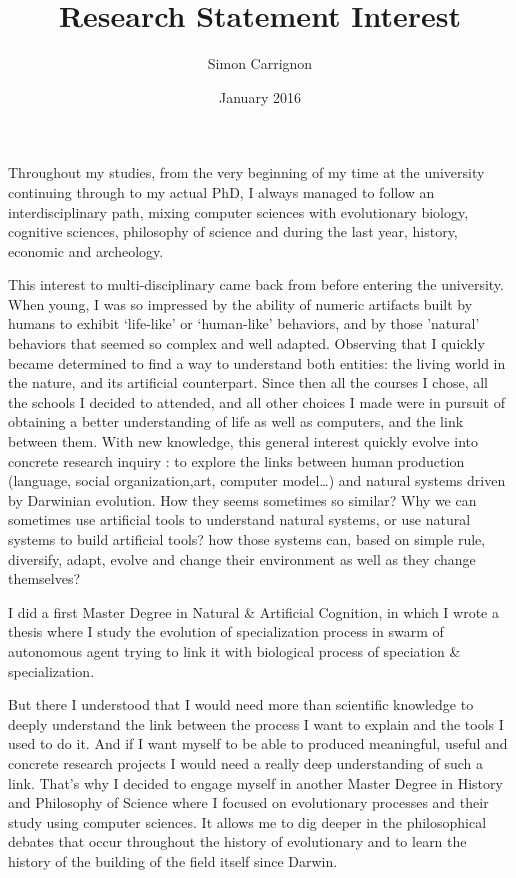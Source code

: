\documentclass[10pt]{paper}
\author{Simon Carrignon}
\title{Research Statement Interest}
\date{January 2016}
\begin{document}
\maketitle


Throughout my studies, from the very beginning of my time at the university continuing through to my actual PhD, I always managed to follow an interdisciplinary path, mixing computer sciences with evolutionary biology, cognitive sciences, philosophy of science and during the last year, history, economic and archeology.

This interest to multi-disciplinary came back from before entering the university. When young, I was so impressed by the ability of numeric artifacts built by humans to exhibit ‘life-like’ or ‘human-like’ behaviors, and by those 'natural' behaviors that seemed so complex and well adapted. Observing that I quickly became determined to find a way to understand both entities: the living world in the nature, and its artificial counterpart. Since then all the courses I chose, all the schools I decided to attended, and all other choices I made were in pursuit of obtaining a better understanding of life as well as computers, and the link between them. 
With new knowledge, this general interest quickly evolve into concrete research inquiry : to explore the links between human production (language, social organization,art, computer model…) and natural systems driven by Darwinian evolution. How they seems sometimes so similar? Why we can sometimes use artificial tools to understand natural systems, or use natural  systems to build artificial tools? how those systems can, based on simple rule, diversify, adapt, evolve and change their environment as well as they change themselves? 

I did a first Master Degree in Natural \& Artificial Cognition, in which I wrote a thesis where I study the evolution of specialization process in swarm of autonomous agent trying to link it with biological process of speciation \& specialization.


But there I understood that I would need more than scientific knowledge to deeply understand the link between the process I want to explain and the tools I used to do it. And if I want myself to be able to produced meaningful, useful and concrete research projects I would need a really deep understanding of such a link. That's why I decided to engage myself in another Master Degree in History and Philosophy of Science where I focused on evolutionary processes and their study using computer sciences. It allows me to dig deeper in the philosophical debates that occur throughout the history of evolutionary and to learn the history of the building of the field itself since Darwin.
\end{document}
